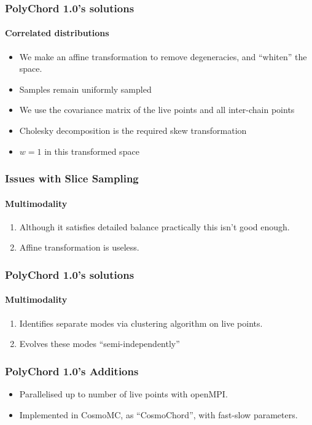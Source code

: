 \documentclass[%
]{beamer}
\begin{document}
\begin{frame}
    \frametitle{PolyChord 1.0's solutions}
  \framesubtitle{Correlated distributions}

  \begin{itemize}
    \pause\item We make an affine transformation to remove degeneracies, and ``whiten'' the space.
    \pause\item Samples remain uniformly sampled
    \pause\item We use the covariance matrix of the live points and all inter-chain points 
    \pause\item Cholesky decomposition is the required skew transformation
    \pause\item $w=1$ in this transformed space
  \end{itemize}
\end{frame}


\begin{frame}
  \frametitle{Issues with Slice Sampling}
  \framesubtitle{Multimodality}

  \begin{enumerate}
    \pause\item Although it satisfies detailed balance practically this isn't good enough.
    \pause\item Affine transformation is useless.
  \end{enumerate}
\end{frame}

\begin{frame}
    \frametitle{PolyChord 1.0's solutions}
  \framesubtitle{Multimodality}

  \begin{enumerate}
    \pause\item Identifies separate modes via clustering algorithm on live points.
    \pause\item Evolves these modes ``semi-independently''
  \end{enumerate}
\end{frame}

\begin{frame}
    \frametitle{PolyChord 1.0's Additions}

  \begin{itemize}
    \pause\item Parallelised up to number of live points with openMPI.
    \pause\item Implemented in CosmoMC, as ``CosmoChord'', with fast-slow parameters.
  \end{itemize}
\end{frame}
\end{document}
